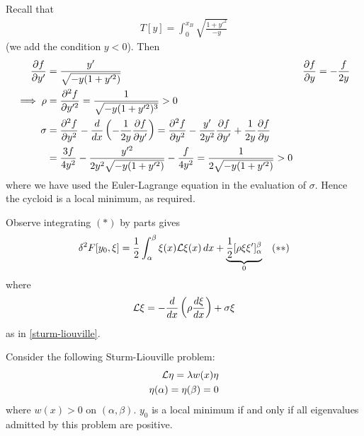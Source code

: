 \documentclass{../../template/note}
\begin{document}
    \begin{example*}[Brachistochrone]
        Recall that
        \begin{align*}
            T[y] = \int_0^{x_B} \sqrt{\frac{1+y'^2}{-y}}
        \end{align*}
        (we add the condition $y < 0$). Then
        \begin{align*}
            \pd{f}{y'} &= \frac{y'}{\sqrt{-y(1+y'^2)}} && \pd{f}{y} = -\frac{f}{2y} \\
            \implies \rho &= \pd{^2f}{y'^2} = \frac 1 {\sqrt{-y(1+y'^2)^3}} > 0 \\
            \sigma &= \pd{^2f}{y^2} - \frac{d}{dx} \left(-\frac{1}{2y} \pd{f}{y'}\right) = \pd{^2f}{y^2} - \frac{y'}{2y^2} \pd{f}{y'} + \frac 1 {2y} \pd{f}{y} \\
            &= \frac{3f}{4y^2} - \frac{y'^2}{2y^2\sqrt{-y(1+y'^2)}} - \frac{f}{4y^2} = \frac 1 {2\sqrt{-y(1+y'^2)}} > 0
        \end{align*}
        where we have used the Euler-Lagrange equation in the evaluation of $\sigma$. Hence the cycloid is a local minimum, as required.       
    \end{example*}
    
    Observe integrating $(*)$ by parts gives
    \begin{align*}
        \delta^2 F[y_0, \xi] = \frac 1 2 \int_\alpha^\beta \xi(x) \mathcal{L} \xi(x) \,d{x} + \underbrace{\frac 1 2 [\rho \xi \xi']_\alpha^\beta}_{0} && (**)
    \end{align*}
    where
    \begin{align*}
        \mathcal{L} \xi = -\frac d {dx} \left(\rho \frac{d\xi}{dx}\right) + \sigma \xi
    \end{align*}
    as in \cref{sturm-liouville}.
    
    \begin{proposition}
        Consider the following Sturm-Liouville problem:
        \begin{align*}
            \mathcal{L} \eta = \lambda w(x) \eta \\
            \eta(\alpha) = \eta(\beta) = 0
        \end{align*}
        where $w(x) > 0$ on $(\alpha, \beta)$. $y_0$ is a local minimum if and only if all eigenvalues admitted by this problem are positive.
    \end{proposition}
    
\end{document}
